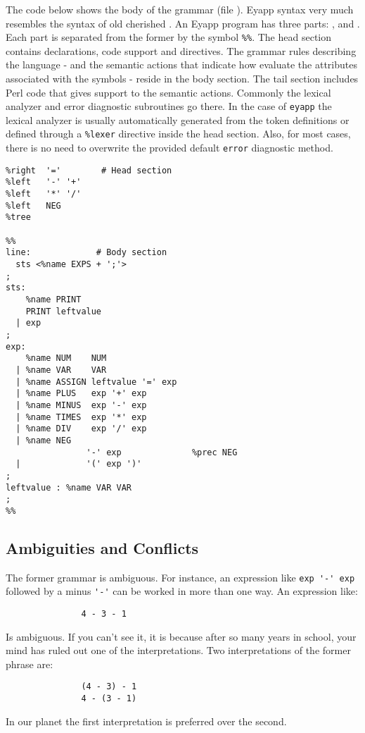 The code below shows the body of the grammar (file 
).
Eyapp syntax very much resembles the syntax of
old cherished  \cite{yacc}.
An Eyapp program has three parts: ,  and .
Each part is separated from the former by the symbol \verb|%%|.
The head section contains declarations, code support
and directives.
The grammar rules describing
the language - and the semantic actions that indicate how
evaluate the attributes associated with the symbols -
reside in the body section.
The tail section includes Perl code that gives support
to the semantic actions. Commonly 
the lexical analyzer and error diagnostic subroutines
go there. In the case of \verb|eyapp| the lexical analyzer 
is usually automatically generated from the token definitions 
or defined through a \verb|%lexer| directive inside 
the head section.  Also,
for most cases, there is no need to overwrite the provided default
\verb|error| diagnostic method.

\begin{verbatim}
%right  '='        # Head section
%left   '-' '+'
%left   '*' '/'
%left   NEG
%tree 

%%
line:             # Body section
  sts <%name EXPS + ';'>
;
sts:
    %name PRINT
    PRINT leftvalue
  | exp 
;
exp:
    %name NUM    NUM
  | %name VAR    VAR
  | %name ASSIGN leftvalue '=' exp
  | %name PLUS   exp '+' exp
  | %name MINUS  exp '-' exp
  | %name TIMES  exp '*' exp
  | %name DIV    exp '/' exp
  | %name NEG
                '-' exp              %prec NEG
  |             '(' exp ')'
;
leftvalue : %name VAR VAR
;
%% 
\end{verbatim}

\subsection{Ambiguities and Conflicts}
The former grammar is ambiguous.  
For instance, an expression like \verb|exp '-' exp| followed by a
minus \verb|'-'| can be worked in more than one way. An expression like:

\begin{verbatim}
               4 - 3 - 1
\end{verbatim}

Is ambiguous. If you can't see it, it is because after so many years in 
school, your mind has ruled out one of the interpretations. Two interpretations
of the former phrase are:
\begin{verbatim}
               (4 - 3) - 1
               4 - (3 - 1)
\end{verbatim}
In our planet the first interpretation is preferred over the second.


